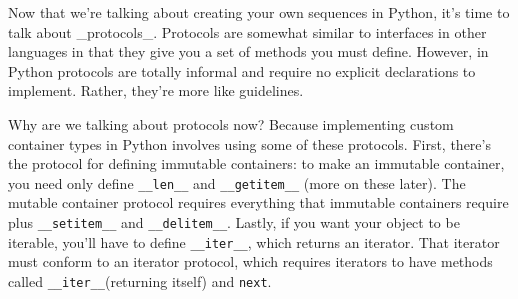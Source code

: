 \documentclass[a4paper,11pt]{article}
\newcommand{\code}[1]{\texttt{#1}}
\begin{document}
Now that we're talking about creating your own sequences in Python, it's time to talk about _protocols_. Protocols are somewhat similar to interfaces in other languages in that they give you a set of methods you must define. However, in Python protocols are totally informal and require no explicit declarations to implement. Rather, they're more like guidelines.

Why are we talking about protocols now? Because implementing custom container types in Python involves using some of these protocols. First, there's the protocol for defining immutable containers: to make an immutable container, you need only define \code{__len__} and \code{__getitem__} (more on these later). The mutable container protocol requires everything that immutable containers require plus \code{__setitem__} and \code{__delitem__}. Lastly, if you want your object to be iterable, you'll have to define \code{__iter__}, which returns an iterator. That iterator must conform to an iterator protocol, which requires iterators to have methods called \code{__iter__}(returning itself) and \code{next}.
\end{document}
